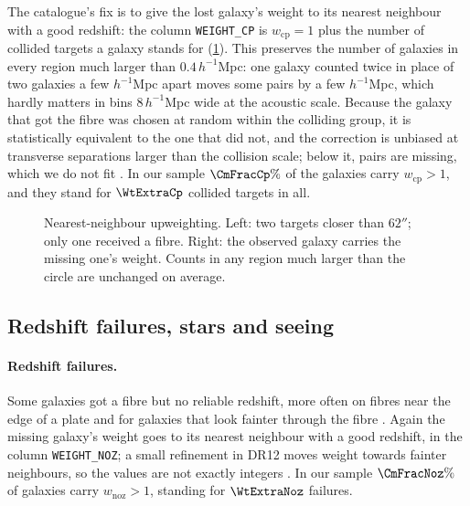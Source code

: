 The catalogue's fix is to give the lost galaxy's weight to its nearest neighbour
with a good redshift: the column \texttt{WEIGHT\_CP} is $w_{\mathrm{cp}}=1$ plus the
number of collided targets a galaxy stands for (\cref{13c:fig:wcp}). This preserves
the number of galaxies in every region much larger than $0.4\,h^{-1}$Mpc: one galaxy
counted twice in place of two galaxies a few $h^{-1}$Mpc apart moves some pairs by a
few $h^{-1}$Mpc, which hardly matters in bins $8\,h^{-1}$Mpc wide at the acoustic
scale. Because the galaxy that got the fibre was chosen at random within the colliding
group, it is statistically equivalent to the one that did not, and the correction is
unbiased at transverse separations larger than the collision scale; below it, pairs
are missing, which we do not fit . In our
sample $\CmFracCp\%$ of the galaxies carry $w_{\mathrm{cp}}>1$, and they stand for
$\WtExtraCp$ collided targets in all.

\begin{figure}[htbp]
\centering
{}
\caption{Nearest-neighbour upweighting. Left: two targets closer than $62''$; only
one received a fibre. Right: the observed galaxy carries the missing one's weight.
Counts in any region much larger than the circle are unchanged on average.}
\label{13c:fig:wcp}
\end{figure}

\subsection{Redshift failures, stars and seeing}
\label{13c:sec:wsys}

\paragraph{Redshift failures.}
Some galaxies got a fibre but no reliable redshift, more often on fibres near the
edge of a plate and for galaxies that look fainter through the fibre
\cite{Ross2012,Reid2016}. Again the missing galaxy's
weight goes to its nearest neighbour with a good redshift, in the column
\texttt{WEIGHT\_NOZ}; a small refinement in DR12 moves weight towards fainter
neighbours, so the values are not exactly integers . In our
sample $\CmFracNoz\%$ of galaxies carry $w_{\mathrm{noz}}>1$, standing for $\WtExtraNoz$
failures.


